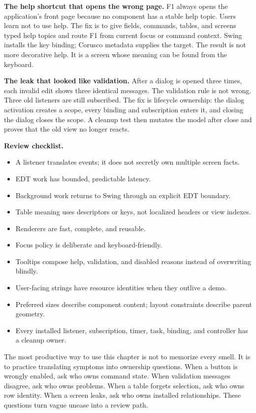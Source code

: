 \textbf{The help shortcut that opens the wrong page.}
F1 always opens the application's front page because no component has a stable
help topic. Users learn not to use help. The fix is to give fields, commands,
tables, and screens typed help topics and route F1 from current focus or command
context. Swing installs the key binding; Corusco metadata supplies the target.
The result is not more decorative help. It is a screen whose meaning can be
found from the keyboard.

\textbf{The leak that looked like validation.}
After a dialog is opened three times, each invalid edit shows three identical
messages. The validation rule is not wrong. Three old listeners are still
subscribed. The fix is lifecycle ownership: the dialog activation creates a
scope, every binding and subscription enters it, and closing the dialog closes
the scope. A cleanup test then mutates the model after close and proves that the
old view no longer reacts.

\textbf{Review checklist.}
\begin{itemize}
\item A listener translates events; it does not secretly own multiple screen facts.
\item EDT work has bounded, predictable latency.
\item Background work returns to Swing through an explicit EDT boundary.
\item Table meaning uses descriptors or keys, not localized headers or view indexes.
\item Renderers are fast, complete, and reusable.
\item Focus policy is deliberate and keyboard-friendly.
\item Tooltips compose help, validation, and disabled reasons instead of overwriting blindly.
\item User-facing strings have resource identities when they outlive a demo.
\item Preferred sizes describe component content; layout constraints describe parent geometry.
\item Every installed listener, subscription, timer, task, binding, and controller has a cleanup owner.
\end{itemize}

The most productive way to use this chapter is not to memorize every smell. It
is to practice translating symptoms into ownership questions. When a button is
wrongly enabled, ask who owns command state. When validation messages disagree,
ask who owns problems. When a table forgets selection, ask who owns row
identity. When a screen leaks, ask who owns installed relationships. These
questions turn vague unease into a review path.


